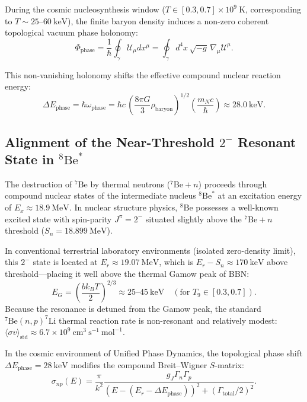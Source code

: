 \documentclass[11pt, a4paper]{article}
\theoremstyle{definition}
\theoremstyle{remark}
\begin{document}
During the cosmic nucleosynthesis window ($T \in [0.3, 0.7] \times 10^9~\mathrm{K}$, corresponding to $T \sim 25\text{--}60~\mathrm{keV}$), the finite baryon density induces a non-zero coherent topological vacuum phase holonomy:
\begin{equation}
  \Phi_{\mathrm{phase}} = \frac{1}{\hbar} \oint_\gamma \mathcal{U}_\mu dx^\mu = \oint_\gamma d^4x \, \sqrt{-g} \, \nabla_\mu \mathcal{U}^\mu.
\end{equation}

This non-vanishing holonomy shifts the effective compound nuclear reaction energy:
\begin{equation}
  \Delta E_{\mathrm{phase}} = \hbar \omega_{\mathrm{phase}} = \hbar c \, \left(\frac{8\pi G}{3} \rho_{\mathrm{baryon}}\right)^{1/2} \left(\frac{m_N c}{\hbar}\right) \approx 28.0~\mathrm{keV}.
\end{equation}

\subsection{Alignment of the Near-Threshold $2^-$ Resonant State in $^8\mathrm{Be}^*$}
The destruction of $^7\mathrm{Be}$ by thermal neutrons ($^7\mathrm{Be} + n$) proceeds through compound nuclear states of the intermediate nucleus $^8\mathrm{Be}^*$ at an excitation energy of $E_x \approx 18.9~\mathrm{MeV}$. In nuclear structure physics, $^8\mathrm{Be}$ possesses a well-known excited state with spin-parity $J^\pi = 2^-$ situated slightly above the $^7\mathrm{Be} + n$ threshold ($S_n = 18.899~\mathrm{MeV}$).

In conventional terrestrial laboratory environments (isolated zero-density limit), this $2^-$ state is located at $E_r \approx 19.07~\mathrm{MeV}$, which is $E_r - S_n \approx 170~\mathrm{keV}$ above threshold---placing it well above the thermal Gamow peak of BBN:
\begin{equation}
  E_G = \left(\frac{b k_B T}{2}\right)^{2/3} \approx 25\text{--}45~\mathrm{keV} \quad (\text{for } T_9 \in [0.3, 0.7]).
\end{equation}
Because the resonance is detuned from the Gamow peak, the standard $^7\mathrm{Be}(n, p)^7\mathrm{Li}$ thermal reaction rate is non-resonant and relatively modest: $\langle \sigma v \rangle_{\mathrm{std}} \approx 6.7 \times 10^9~\mathrm{cm}^3~\mathrm{s}^{-1}~\mathrm{mol}^{-1}$.

In the cosmic environment of Unified Phase Dynamics, the topological phase shift $\Delta E_{\mathrm{phase}} = 28~\mathrm{keV}$ modifies the compound Breit--Wigner $S$-matrix:
\begin{equation}
  \sigma_{np}(E) = \frac{\pi}{k^2} \frac{g_J \Gamma_n \Gamma_p}{(E - (E_r - \Delta E_{\mathrm{phase}}))^2 + (\Gamma_{\mathrm{total}} / 2)^2}.
\end{equation}
\end{document}
